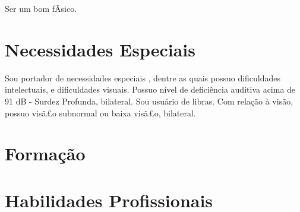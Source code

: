 \documentclass[10pt]{article} %
\begin{document}
Ser um bom fÃ­sico.


\section{Necessidades Especiais}
Sou portador de necessidades especiais
, dentre as quais possuo dificuldades intelectuais,  e dificuldades visuais. Possuo nível de deficiência auditiva acima de 91 dB - Surdez Profunda, bilateral. Sou usuário de libras. Com relação à visão, possuo visã£o subnormal ou baixa visã£o, bilateral. 


\section{Formação}



  
\section{Habilidades Profissionais}  
  
  
\end{document}
